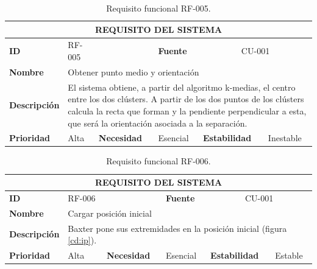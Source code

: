 \begin{table}[H]
	\centering
	\begin{tabular}{|p{2cm} | p{1.5cm} | p{2cm} | p{1.7cm} | p{2cm} | p{2cm} |}
		\hline
		\multicolumn{6}{|c|}{\textbf{REQUISITO DEL SISTEMA}} \\ 
		\hline
		\textbf{ID} & RF-005 & & \textbf{Fuente} & \multicolumn{2}{c|}{CU-001} \\
		\hline
		\textbf{Nombre} & \multicolumn{5}{l|}{Obtener punto medio y orientación} \\
		\hline
		\textbf{Descripción} & \multicolumn{5}{l|}{\parbox{30em}{El sistema obtiene, a partir del algoritmo k-medias, el centro entre los dos clústers. A partir de los dos puntos de los clústers calcula la recta que forman y la pendiente perpendicular a esta, que será la orientación asociada a la separación.}} \\
		\hline
		\textbf{Prioridad} & Alta & \textbf{Necesidad} & Esencial & \textbf{Estabilidad} & Inestable \\
		\hline		
	\end{tabular}
	\caption{Requisito funcional RF-005.}
	\label{cuad:RF-005}
\end{table}

\begin{table}[H]
	\centering
	\begin{tabular}{|p{2cm} | p{1.5cm} | p{2cm} | p{1.7cm} | p{2cm} | p{2cm} |}
		\hline
		\multicolumn{6}{|c|}{\textbf{REQUISITO DEL SISTEMA}} \\ 
		\hline
		\textbf{ID} & RF-006 & & \textbf{Fuente} & \multicolumn{2}{c|}{CU-001} \\
		\hline
		\textbf{Nombre} & \multicolumn{5}{l|}{Cargar posición inicial} \\
		\hline
		\textbf{Descripción} & \multicolumn{5}{l|}{\parbox{30em}{Baxter pone sus extremidades en la posición inicial (figura \ref*{cd:ip}).}} \\
		\hline
		\textbf{Prioridad} & Alta & \textbf{Necesidad} & Esencial & \textbf{Estabilidad} & Estable \\
		\hline		
	\end{tabular}
	\caption{Requisito funcional RF-006.}
	\label{cuad:RF-006}
\end{table}

